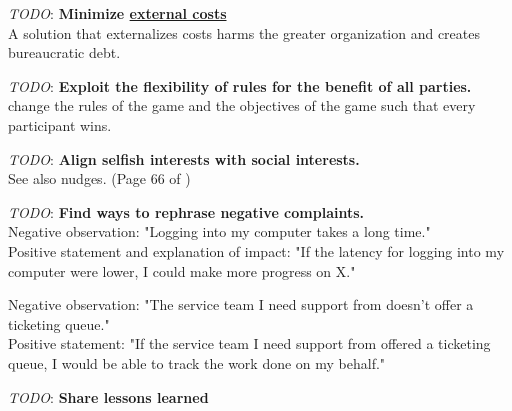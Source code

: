 \textit{TODO}: \textbf{Minimize \href{https://en.wikipedia.org/wiki/Externality}{external costs}}\\
A solution that externalizes costs harms the greater organization and creates bureaucratic debt.


\textit{TODO}: \textbf{Exploit the flexibility of rules for the benefit of all parties.}\\
change the rules of the game and the objectives of the game such that every participant wins.

\textit{TODO}: \textbf{Align selfish interests with social interests.}\\
See also nudges. 
(Page 66 of \cite{2012_Schneier})

\textit{TODO}: \textbf{Find ways to rephrase negative complaints.}\\
Negative observation: "Logging into my computer takes a long time."\\
Positive statement and explanation of impact: "If the latency for logging into my computer were lower, I could make more progress on X."


Negative observation: "The service team I need support from doesn't offer a ticketing queue."\\
Positive statement: "If the service team I need support from offered a ticketing queue, I would be able to track the work done on my behalf."

\textit{TODO}: \textbf{Share lessons learned}\\